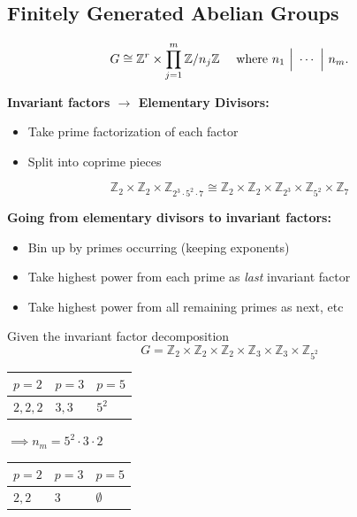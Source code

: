 \hypertarget{finitely-generated-abelian-groups}{%
\subsection{Finitely Generated Abelian
Groups}\label{finitely-generated-abelian-groups}}

\[
G \cong {\mathbb{Z}}^r \times \prod_{j=1}^m {\mathbb{Z}}/n_j{\mathbb{Z}}
\quad \text{ where } n_1 {~\Bigm|~}\cdots {~\Bigm|~}n_m
.\]

\textbf{Invariant factors \(\longrightarrow\) Elementary Divisors:}

\begin{itemize}
\tightlist
\item
  Take prime factorization of each factor
\item
  Split into coprime pieces
\end{itemize}

\[
{\mathbb{Z}}_2 \times {\mathbb{Z}}_2 \times {\mathbb{Z}}_{2^3 \cdot 5^2 \cdot 7}
\cong
{\mathbb{Z}}_2 \times {\mathbb{Z}}_2 \times {\mathbb{Z}}_{2^3} \times {\mathbb{Z}}_{5^2} \times {\mathbb{Z}}_7
\]

\textbf{Going from elementary divisors to invariant factors:}

\begin{itemize}
\tightlist
\item
  Bin up by primes occurring (keeping exponents)
\item
  Take highest power from each prime as \emph{last} invariant factor
\item
  Take highest power from all remaining primes as next, etc
\end{itemize}

Given the invariant factor decomposition \[
G = {{\mathbb{Z}}_{2}\times{\mathbb{Z}}_{2}\times{\mathbb{Z}}_{2}\times{\mathbb{Z}}_{3}\times{\mathbb{Z}}_{3}\times{\mathbb{Z}}_{5^2}}
\]

\begin{longtable}[]{@{}lll@{}}
\toprule
\(p = 2\) & \(p= 3\) & \(p =5\)\tabularnewline
\midrule
\endhead
\(2,2,2\) & \(3,3\) & \(5^2\)\tabularnewline
\bottomrule
\end{longtable}

\(\implies n_m = 5^2 \cdot 3 \cdot 2\)

\begin{longtable}[]{@{}lll@{}}
\toprule
\(p = 2\) & \(p= 3\) & \(p =5\)\tabularnewline
\midrule
\endhead
\(2,2\) & \(3\) & \(\emptyset\)\tabularnewline
\bottomrule
\end{longtable}

